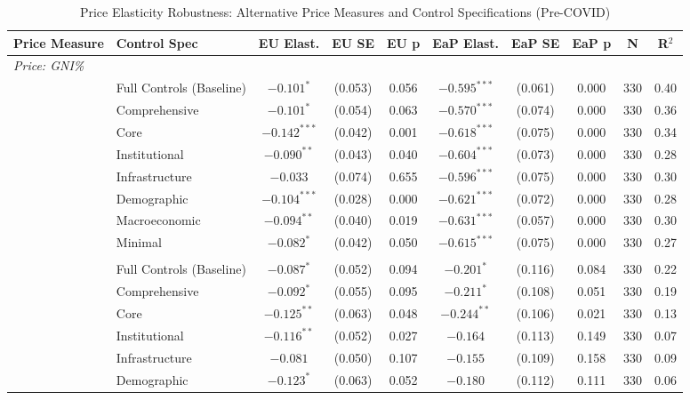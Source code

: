 \begin{table}[!htbp]
\centering
\caption{Price Elasticity Robustness: Alternative Price Measures and Control Specifications (Pre-COVID)}
\label{tab:price_robustness}
\begin{minipage}{\textwidth}
\begin{adjustbox}{width=\textwidth}
\scriptsize
\begin{tabular}{llcccccccc}
\toprule
Price Measure & Control Spec & EU Elast. & EU SE & EU p & EaP Elast. & EaP SE & EaP p & N & R$^2$ \\
\midrule
\multicolumn{10}{l}{\textit{Price: GNI\%}} \\
 & Full Controls (Baseline) & $-0.101^{*}$ & (0.053) & 0.056 & $-0.595^{***}$ & (0.061) & 0.000 & 330 & 0.40 \\
 & Comprehensive & $-0.101^{*}$ & (0.054) & 0.063 & $-0.570^{***}$ & (0.074) & 0.000 & 330 & 0.36 \\
 & Core & $-0.142^{***}$ & (0.042) & 0.001 & $-0.618^{***}$ & (0.075) & 0.000 & 330 & 0.34 \\
 & Institutional & $-0.090^{**}$ & (0.043) & 0.040 & $-0.604^{***}$ & (0.073) & 0.000 & 330 & 0.28 \\
 & Infrastructure & $-0.033$ & (0.074) & 0.655 & $-0.596^{***}$ & (0.075) & 0.000 & 330 & 0.30 \\
 & Demographic & $-0.104^{***}$ & (0.028) & 0.000 & $-0.621^{***}$ & (0.072) & 0.000 & 330 & 0.28 \\
 & Macroeconomic & $-0.094^{**}$ & (0.040) & 0.019 & $-0.631^{***}$ & (0.057) & 0.000 & 330 & 0.30 \\
 & Minimal & $-0.082^{*}$ & (0.042) & 0.050 & $-0.615^{***}$ & (0.075) & 0.000 & 330 & 0.27 \\
\addlinespace
\multicolumn{10}{l}{\textit{Price: PPP}} \\
 & Full Controls (Baseline) & $-0.087^{*}$ & (0.052) & 0.094 & $-0.201^{*}$ & (0.116) & 0.084 & 330 & 0.22 \\
 & Comprehensive & $-0.092^{*}$ & (0.055) & 0.095 & $-0.211^{*}$ & (0.108) & 0.051 & 330 & 0.19 \\
 & Core & $-0.125^{**}$ & (0.063) & 0.048 & $-0.244^{**}$ & (0.106) & 0.021 & 330 & 0.13 \\
 & Institutional & $-0.116^{**}$ & (0.052) & 0.027 & $-0.164$ & (0.113) & 0.149 & 330 & 0.07 \\
 & Infrastructure & $-0.081$ & (0.050) & 0.107 & $-0.155$ & (0.109) & 0.158 & 330 & 0.09 \\
 & Demographic & $-0.123^{*}$ & (0.063) & 0.052 & $-0.180$ & (0.112) & 0.111 & 330 & 0.06 \\

\end{tabular}
\end{adjustbox}
\end{minipage}
\end{table}
